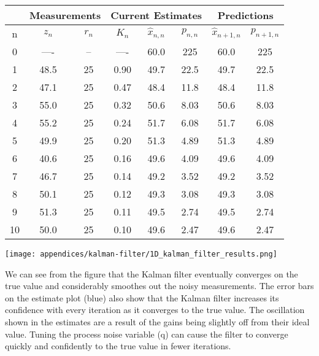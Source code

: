 \begin{fitbox}[frametitle=Example]
    \begin{center}
        \begin{tabular}{c | c | c | c | c | c | c | c}
        \toprule
        & \multicolumn{2}{c}{Measurements} & \multicolumn{3}{c}{Current Estimates} & \multicolumn{2}{c}{Predictions} \\
        \midrule
        n & $z_n$ & $r_n$ & $K_n$ & $\hat{x}_{n,n}$ & $ p_{n,n} $ & $ \hat{x}_{n+1,n}$ & $ p_{n+1,n} $ \\
        \midrule

        0  & ---- & -- & ---- & 60.0 & 225  & 60.0 & 225  \\
        1  & 48.5 & 25 & 0.90 & 49.7 & 22.5 & 49.7 & 22.5 \\
        2  & 47.1 & 25 & 0.47 & 48.4 & 11.8 & 48.4 & 11.8 \\
        3  & 55.0 & 25 & 0.32 & 50.6 & 8.03 & 50.6 & 8.03 \\
        4  & 55.2 & 25 & 0.24 & 51.7 & 6.08 & 51.7 & 6.08 \\
        5  & 49.9 & 25 & 0.20 & 51.3 & 4.89 & 51.3 & 4.89 \\
        6  & 40.6 & 25 & 0.16 & 49.6 & 4.09 & 49.6 & 4.09 \\
        7  & 46.7 & 25 & 0.14 & 49.2 & 3.52 & 49.2 & 3.52 \\
        8  & 50.1 & 25 & 0.12 & 49.3 & 3.08 & 49.3 & 3.08 \\
        9  & 51.3 & 25 & 0.11 & 49.5 & 2.74 & 49.5 & 2.74 \\
        10 & 50.0 & 25 & 0.10 & 49.6 & 2.47 & 49.6 & 2.47 \\

        \bottomrule
        \end{tabular}
    \end{center}

    \begin{center}
        \texttt{[image: appendices/kalman-filter/1D\_kalman\_filter\_results.png]}
    \end{center}

    We can see from the figure that the Kalman filter eventually converges on the true value and considerably smoothes out the noisy measurements.
    The error bars on the estimate plot (blue) also show that the Kalman filter increases its confidence with every iteration as it converges to the true value.
    The oscillation shown in the estimates are a result of the gains being slightly off from their ideal value.
    Tuning the process noise variable (q) can cause the filter to converge quickly and confidently to the true value in fewer iterations.

\end{fitbox}

